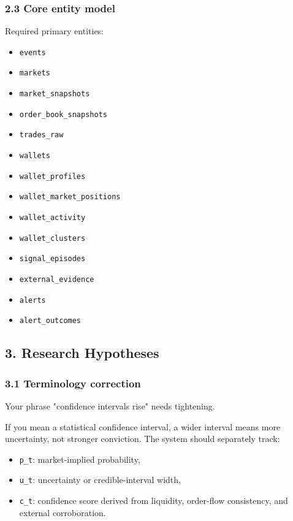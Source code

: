 \documentclass[
]{article}
\providecommand{\tightlist}{%
  \setlength{\itemsep}{0pt}\setlength{\parskip}{0pt}}
\begin{document}
\subsubsection{2.3 Core entity model}\label{23-core-entity-model}

Required primary entities:

\begin{itemize}
\tightlist
\item
  \texttt{events}
\item
  \texttt{markets}
\item
  \texttt{market\_snapshots}
\item
  \texttt{order\_book\_snapshots}
\item
  \texttt{trades\_raw}
\item
  \texttt{wallets}
\item
  \texttt{wallet\_profiles}
\item
  \texttt{wallet\_market\_positions}
\item
  \texttt{wallet\_activity}
\item
  \texttt{wallet\_clusters}
\item
  \texttt{signal\_episodes}
\item
  \texttt{external\_evidence}
\item
  \texttt{alerts}
\item
  \texttt{alert\_outcomes}
\end{itemize}

\subsection{3. Research Hypotheses}\label{3-research-hypotheses}

\subsubsection{3.1 Terminology
correction}\label{31-terminology-correction}

Your phrase "confidence intervals rise" needs tightening.

If you mean a statistical confidence interval, a wider interval means
more uncertainty, not stronger conviction. The system should separately
track:

\begin{itemize}
\tightlist
\item
  \texttt{p\_t}: market-implied probability,
\item
  \texttt{u\_t}: uncertainty or credible-interval width,
\item
  \texttt{c\_t}: confidence score derived from liquidity, order-flow
  consistency, and external corroboration.
\end{itemize}
\end{document}
